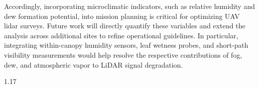 \documentclass{isprs} %
\begin{document}
Accordingly, incorporating microclimatic indicators, such as relative humidity and dew formation potential, into mission planning is critical for optimizing UAV lidar surveys. Future work will directly quantify these variables and extend the analysis across additional sites to refine operational guidelines. In particular, integrating within-canopy humidity sensors, leaf wetness probes, and short-path visibility measurements would help resolve the respective contributions of fog, dew, and atmospheric vapor to LiDAR signal degradation.


{
	\begin{spacing}{1.17}
		\normalsize
	\end{spacing}
}
\end{document}
